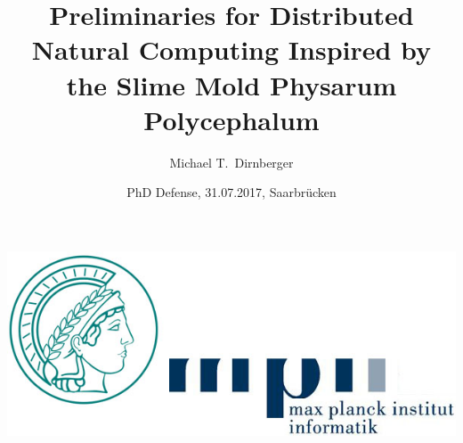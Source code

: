 \documentclass[	hyperref={pdfpagelabels=false}, xcolor=dvipsnames,
		11pt]{beamer}
\title{Preliminaries for Distributed Natural Computing Inspired by the Slime Mold Physarum Polycephalum}
\author{Michael T.\ Dirnberger}
\institute{Max Planck Institute for Informatics}
\date{PhD Defense, 31.07.2017, Saarbr\"ucken\\[2em]}
\begin{document}
\begin{frame}[plain]

\titlepage
\vspace{-1cm}
	    \begin{center}
		\includegraphics[width=0.3\linewidth]{./pics/mpilogo}
	    \end{center}
\end{frame} 


\end{document}

